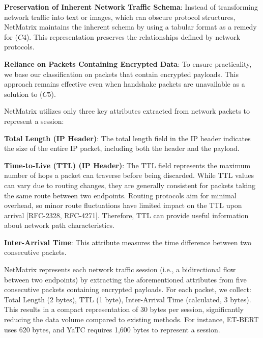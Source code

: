 \textbf{Preservation of Inherent Network Traffic Schema}: Instead of transforming network traffic into text or images, which can obscure protocol structures, NetMatrix maintains the inherent schema by using a tabular format as a remedy for ($C4$). This representation preserves the relationships defined by network protocols.

\textbf{Reliance on Packets Containing Encrypted Data}: To ensure practicality, we base our classification on packets that contain encrypted payloads. This approach remains effective even when handshake packets are unavailable as a solution to ($C5$).

NetMatrix utilizes only three key attributes extracted from network packets to represent a session:

\textbf{Total Length (IP Header)}: The total length field in the IP header indicates the size of the entire IP packet, including both the header and the payload.

\textbf{Time-to-Live (TTL) (IP Header)}: The TTL field represents the maximum number of hops a packet can traverse before being discarded. While TTL values can vary due to routing changes, they are generally consistent for packets taking the same route between two endpoints. Routing protocols aim for minimal overhead, so minor route fluctuations have limited impact on the TTL upon arrival [RFC-2328, RFC-4271]. Therefore, TTL can provide useful information about network path characteristics.

\textbf{Inter-Arrival Time}: This attribute measures the time difference between two consecutive packets.

NetMatrix represents each network traffic session (i.e., a bidirectional flow between two endpoints) by extracting the aforementioned attributes from five consecutive packets containing encrypted payloads. For each packet, we collect: Total Length (2 bytes), TTL (1 byte), Inter-Arrival Time (calculated, 3 bytes). This results in a compact representation of 30 bytes per session, significantly reducing the data volume compared to existing methods. For instance, ET-BERT uses 620 bytes, and YaTC requires 1,600 bytes to represent a session. 



